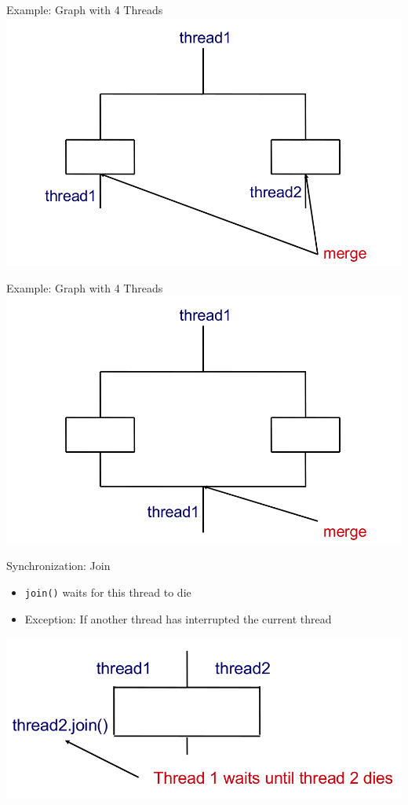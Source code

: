 \begin{frame}{Example: Graph with 4 Threads}
  \includegraphics[width=\textwidth]{figures/thread-4}
\end{frame}

\begin{frame}{Example: Graph with 4 Threads}
  \includegraphics[width=\textwidth]{figures/thread-5}
\end{frame}

\begin{frame}{Synchronization: Join}
  \begin{itemize}
  \item \lstinline!join()! waits for this thread to die
  \item Exception: If another thread has interrupted the current
    thread
  \end{itemize}


  \begin{center}
    \includegraphics[scale=0.4]{figures/join}
  \end{center}
\end{frame}

